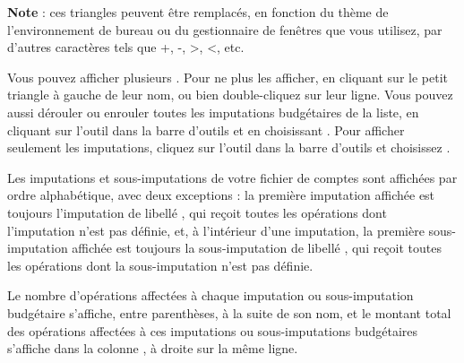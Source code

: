 \textbf{Note} : ces triangles peuvent être remplacés, en fonction du thème de l'environnement de bureau ou du gestionnaire de fenêtres que vous utilisez, par d'autres caractères tels que +, -, >, <, etc. 


Vous pouvez afficher plusieurs . Pour ne plus les afficher,  en cliquant sur le petit triangle à gauche de leur nom, ou bien double-cliquez sur leur ligne. Vous pouvez aussi dérouler ou enrouler toutes les imputations budgétaires de la liste, en cliquant sur l'outil  dans la barre d'outils et en choisissant . Pour afficher seulement les imputations, cliquez sur l'outil  dans la barre d'outils et choisissez .

Les imputations et sous-imputations de votre fichier de comptes sont affichées par ordre alphabétique, avec deux exceptions : la première imputation affichée est toujours l'imputation de libellé , qui reçoit toutes les opérations dont l'imputation n'est pas définie, et, à l'intérieur d'une imputation, la première sous-imputation affichée est toujours la sous-imputation de libellé  , qui reçoit toutes les opérations dont la sous-imputation n'est pas définie.

Le nombre d'opérations affectées à chaque imputation ou sous-imputation budgétaire s'affiche, entre parenthèses, à la suite de son nom, et le montant total des opérations affectées à ces imputations ou sous-imputations budgétaires s'affiche dans la colonne , à droite sur la même ligne. 



